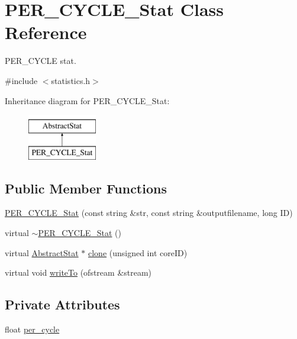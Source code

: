 \hypertarget{classPER__CYCLE__Stat}{
\section{PER\_\-CYCLE\_\-Stat Class Reference}
\label{classPER__CYCLE__Stat}
}


PER\_\-CYCLE stat.  




{\ttfamily \#include $<$statistics.h$>$}

Inheritance diagram for PER\_\-CYCLE\_\-Stat:\begin{figure}[H]
\begin{center}
\leavevmode
\includegraphics[height=2.000000cm]{classPER__CYCLE__Stat}
\end{center}
\end{figure}
\subsection*{Public Member Functions}
\begin{DoxyCompactItemize}
\item 
\hyperlink{classPER__CYCLE__Stat_aeca09801bc358cd3f0e6efd6e26f667a}{PER\_\-CYCLE\_\-Stat} (const string \&str, const string \&outputfilename, long ID)
\item 
virtual \hyperlink{classPER__CYCLE__Stat_a6b6ad6f5d210941b1893f2a0cb8f1b4c}{$\sim$PER\_\-CYCLE\_\-Stat} ()
\item 
virtual \hyperlink{classAbstractStat}{AbstractStat} $\ast$ \hyperlink{classPER__CYCLE__Stat_ae97b00337c422362a6a234b854141bdc}{clone} (unsigned int coreID)
\item 
virtual void \hyperlink{classPER__CYCLE__Stat_afbaf94b274ded7040fe3592a44cc5769}{writeTo} (ofstream \&stream)
\end{DoxyCompactItemize}
\subsection*{Private Attributes}
\begin{DoxyCompactItemize}
\item 
float \hyperlink{classPER__CYCLE__Stat_a01dce57aa26a221ac719276fafa58396}{per\_\-cycle}
\end{DoxyCompactItemize}


